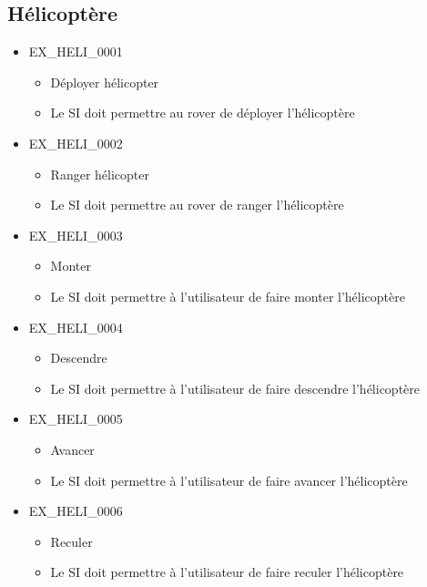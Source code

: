\documentclass[12pt,a4paper]{scrartcl}
\begin{document}
\subsection {Hélicoptère}

\begin{itemize}

\item EX\_HELI\_0001
\begin{itemize}
\item Déployer hélicopter
\item Le SI doit permettre au rover de déployer l'hélicoptère
\end{itemize}

\item EX\_HELI\_0002
\begin{itemize}
\item Ranger hélicopter
\item Le SI doit permettre au rover de ranger l'hélicoptère
\end{itemize}

\item EX\_HELI\_0003
\begin{itemize}
\item Monter
\item Le SI doit permettre à l'utilisateur de faire monter l'hélicoptère
\end{itemize}

\item EX\_HELI\_0004
\begin{itemize}
\item Descendre
\item Le SI doit permettre à l'utilisateur de faire descendre l'hélicoptère
\end{itemize}

\item EX\_HELI\_0005
\begin{itemize}
\item Avancer
\item Le SI doit permettre à l'utilisateur de faire avancer l'hélicoptère
\end{itemize}

\item EX\_HELI\_0006
\begin{itemize}
\item Reculer
\item Le SI doit permettre à l'utilisateur de faire reculer l'hélicoptère
\end{itemize}


\end{itemize}
\end{document}
